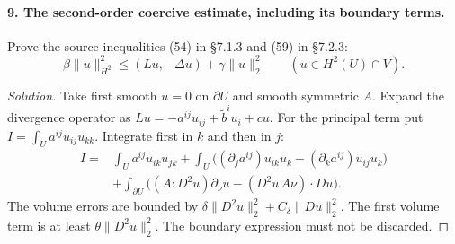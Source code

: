 \paragraph{9. The second-order coercive estimate, including its boundary terms.}
Prove the source inequalities (54) in \S7.1.3 and (59) in \S7.2.3:
\begin{equation}\label{eq:7-h2-coercive}
 \beta\|u\|_{H^2}^2\leq(Lu,-\Delta u)+\gamma\|u\|_2^2
 \qquad(u\in H^2(U)\cap V).
\end{equation}
\begin{proof}[Solution]
Take first smooth $u=0$ on $\partial U$ and smooth symmetric $A$.
Expand the divergence operator as $Lu=-a^{ij}u_{ij}+\widetilde b^iu_i+cu$.
For the principal term put $I=\int_Ua^{ij}u_{ij}u_{kk}$. Integrate first
in $k$ and then in $j$:
\[
 \begin{split}
 I={}&\int_U a^{ij}u_{ik}u_{jk}
 +\int_U\big((\partial_j a^{ij})u_{ik}u_k
                 -(\partial_k a^{ij})u_{ij}u_k\big)\\
 &+\int_{\partial U}\big((A:D^2u)\partial_\nu u
                         -(D^2u\,A\nu)\cdot Du\big).
 \end{split}
\]
The volume errors are bounded by
$\delta\|D^2u\|_2^2+C_\delta\|Du\|_2^2$.
The first volume term is at least $\theta\|D^2u\|_2^2$.
The boundary expression must not be discarded.


\end{proof}
